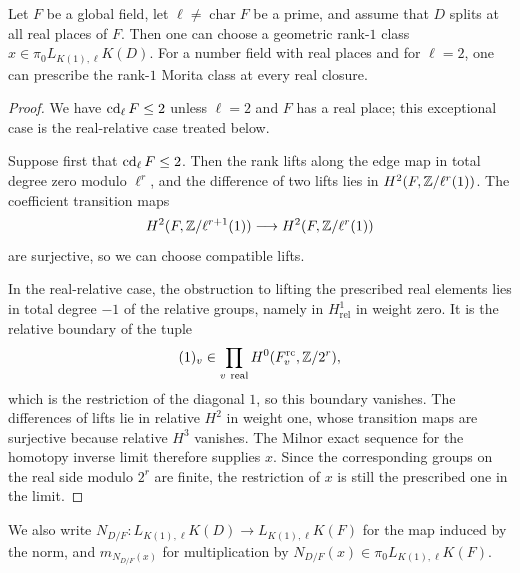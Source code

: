 \begin{proposition}\label{prop:global-rank}
Let $F$ be a global field, let $\ell\ne\operatorname{char}F$ be a prime, and assume that $D$ splits at all real places of $F$.
Then one can choose a geometric rank-$1$ class $x\in\pi_0L_{K(1),\ell}K(D)$.
For a number field with real places and for $\ell=2$, one can prescribe the rank-$1$ Morita class at every real closure.
\end{proposition}
\begin{proof}
We have $\operatorname{cd}_\ell F\le2$ unless $\ell=2$ and $F$ has a real place; this exceptional case is the real-relative case treated below.

Suppose first that $\operatorname{cd}_\ell F\le2$.
Then the rank lifts along the edge map in total degree zero modulo $\ell^r$, and the difference of two lifts lies in $H^2(F,\mathbb Z/\ell^r(1))$.
The coefficient transition maps
\[
 H^2(F,\mathbb Z/\ell^{r+1}(1))\longrightarrow H^2(F,\mathbb Z/\ell^r(1))
\]
are surjective, so we can choose compatible lifts.

In the real-relative case, the obstruction to lifting the prescribed real elements lies in total degree $-1$ of the relative groups, namely in $H^1_{\mathrm{rel}}$ in weight zero.
It is the relative boundary of the tuple
\[
 (1)_v\in\prod_{v\ \mathrm{real}}H^0(F_v^{\mathrm{rc}},\Z/2^r),
\]
which is the restriction of the diagonal $1$, so this boundary vanishes.
The differences of lifts lie in relative $H^2$ in weight one, whose transition maps are surjective because relative $H^3$ vanishes.
The Milnor exact sequence for the homotopy inverse limit therefore supplies $x$.
Since the corresponding groups on the real side modulo $2^r$ are finite, the restriction of $x$ is still the prescribed one in the limit.
\end{proof}

We also write $N_{D/F}\colon L_{K(1),\ell}K(D)\to L_{K(1),\ell}K(F)$ for the map induced by the norm, and $m_{N_{D/F}(x)}$ for multiplication by $N_{D/F}(x)\in\pi_0L_{K(1),\ell}K(F)$.

